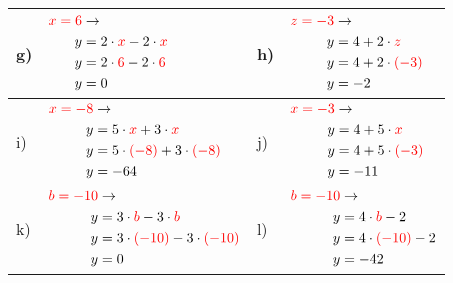 \documentclass[12pt]{article}
\begin{document}
\begin{xltabular}{\textwidth}{|C{0.75cm}|X|C{0.75cm}|X|}
g)&$\begin{aligned}
\textcolor{red}{x=6} & \rightarrow\\
y&=2 \cdot \textcolor{red}{x} - 2 \cdot \textcolor{red}{x}\\
y&=2 \cdot \textcolor{red}{6} - 2 \cdot \textcolor{red}{6}\\
y&=0\\
\end{aligned}$
&
h)&$\begin{aligned}
\textcolor{red}{z=-3} & \rightarrow\\
y&=4 + 2 \cdot \textcolor{red}{z}\\
y&=4 + 2 \cdot \textcolor{red}{(-3)}\\
y&=-2\\
\end{aligned}$
\\\hline
i)&$\begin{aligned}
\textcolor{red}{x=-8} & \rightarrow\\
y&=5 \cdot \textcolor{red}{x} + 3 \cdot \textcolor{red}{x}\\
y&=5 \cdot \textcolor{red}{(-8)} + 3 \cdot \textcolor{red}{(-8)}\\
y&=-64\\
\end{aligned}$
&
j)&$\begin{aligned}
\textcolor{red}{x=-3} & \rightarrow\\
y&=4 + 5 \cdot \textcolor{red}{x}\\
y&=4 + 5 \cdot \textcolor{red}{(-3)}\\
y&=-11\\
\end{aligned}$
\\\hline
k)&$\begin{aligned}
\textcolor{red}{b=-10} & \rightarrow\\
y&=3 \cdot \textcolor{red}{b} - 3 \cdot \textcolor{red}{b}\\
y&=3 \cdot \textcolor{red}{(-10)} - 3 \cdot \textcolor{red}{(-10)}\\
y&=0\\
\end{aligned}$
&
l)&$\begin{aligned}
\textcolor{red}{b=-10} & \rightarrow\\
y&=4 \cdot \textcolor{red}{b} - 2\\
y&=4 \cdot \textcolor{red}{(-10)} - 2\\
y&=-42\\
\end{aligned}$

\end{xltabular}
\end{document}
